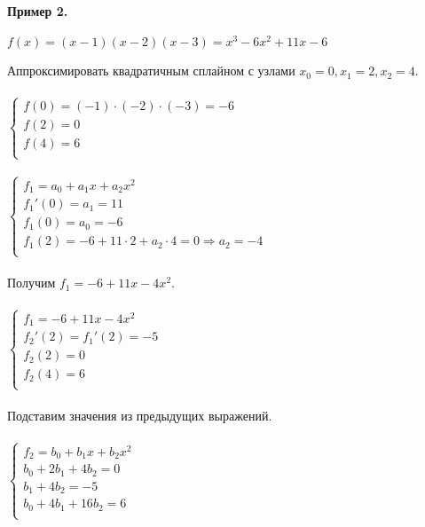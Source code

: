 \documentclass[12pt]{article}
\theoremstyle{definition}
\numberwithin{equation}{section}
\begin{document}
\noindent \textbf{Пример 2.}
\begin{center}$f(x) = (x-1)(x-2)(x-3) = x^3-6x^2+11x-6$\end{center}
Аппроксимировать квадратичным сплайном с узлами $x_0=0, x_1=2, x_2=4$.\\ \\
$  
\left\{  
\begin{array}{lcl}
f(0)=(-1)\cdot (-2)\cdot (-3)=-6\\
f(2)=0\\
f(4)=6\\
\end{array}   
\right.  
$
\\ \\
$  
\left\{  
\begin{array}{lcl}
f_1 = a_0+a_1x+a_2x^2\\
f_1'(0) = a_1 = 11\\
f_1(0) = a_0 = -6\\
f_1(2) = -6+11\cdot 2+a_2\cdot 4 = 0 \Rightarrow a_2 = -4\\
\end{array}   
\right.  
$
\\ \\
Получим $f_1 = -6+11x-4x^2$. \\ \\
$  
\left\{  
\begin{array}{lcl}
f_1 = -6+11x-4x^2\\
f_2'(2) = f_1'(2) = -5\\
f_2(2) = 0\\
f_2(4) = 6\\
\end{array}   
\right.  
$
\\ ~\\
Подставим значения из предыдущих выражений.\\ \\
$
\left\{  
\begin{array}{lcl}
f_2 = b_0+b_1x+b_2x^2\\
b_0+2b_1+4b_2 = 0\\
b_1+4b_2 = -5\\
b_0+4b_1+16b_2 = 6\\
\end{array}   
\right.  
$
\\ \\
\end{document}
